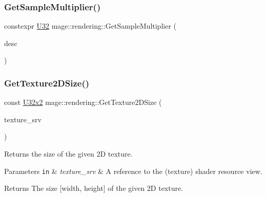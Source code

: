 \mbox{\label{namespacemage_1_1rendering_a8974628b18f5bb28f8f7c570998872d5}} 
\subsubsection{\texorpdfstring{Get\+Sample\+Multiplier()}{GetSampleMultiplier()}}
{\footnotesize\ttfamily constexpr \mbox{\hyperlink{namespacemage_aa5d6eaabaac3cdd01873d6a3d27e90f3}{U32}} mage\+::rendering\+::\+Get\+Sample\+Multiplier (\begin{DoxyParamCaption}\item[{\mbox{\hyperlink{namespacemage_1_1rendering_ac3f75e49e92b42f2f5fb55c450d8899c}{Anti\+Aliasing}}}]{desc }\end{DoxyParamCaption})\hspace{0.3cm}{\ttfamily [noexcept]}}

\mbox{\label{namespacemage_1_1rendering_ac4021886dd6be0385ba158152bb00557}} 
\subsubsection{\texorpdfstring{Get\+Texture2\+D\+Size()}{GetTexture2DSize()}\hspace{0.1cm}{\footnotesize\ttfamily [1/2]}}
{\footnotesize\ttfamily const \mbox{\hyperlink{namespacemage_a31f2bb52b5080e706e1c13de07c0a249}{U32x2}} mage\+::rendering\+::\+Get\+Texture2\+D\+Size (\begin{DoxyParamCaption}\item[{I\+D3\+D11\+Shader\+Resource\+View \&}]{texture\+\_\+srv }\end{DoxyParamCaption})}

Returns the size of the given 2D texture.


\begin{DoxyParams}[1]{Parameters}
\mbox{\tt in}  & {\em texture\+\_\+srv} & A reference to the (texture) shader resource view. \\
\hline
\end{DoxyParams}
\begin{DoxyReturn}{Returns}
The size \mbox{[}width, height\mbox{]} of the given 2D texture. 
\end{DoxyReturn}

